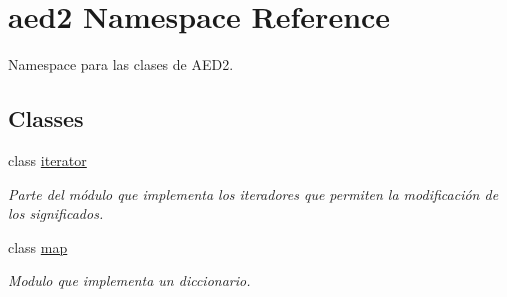\hypertarget{namespaceaed2}{}\section{aed2 Namespace Reference}
\label{namespaceaed2}


Namespace para las clases de A\+E\+D2.  


\subsection*{Classes}
\begin{DoxyCompactItemize}
\item 
class \hyperlink{classaed2_1_1iterator}{iterator}
\begin{DoxyCompactList}\small\item\em Parte del módulo que implementa los iteradores que permiten la modificación de los significados. \end{DoxyCompactList}\item 
class \hyperlink{classaed2_1_1map}{map}
\begin{DoxyCompactList}\small\item\em Modulo que implementa un diccionario. \end{DoxyCompactList}\end{DoxyCompactItemize}
